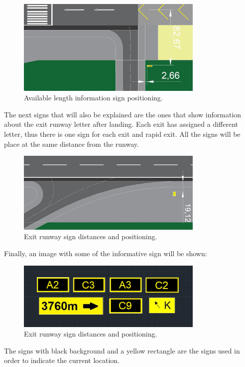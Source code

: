 	\begin{figure}[H]
		\centering
		\includegraphics[clip, trim=0cm 0cm 0cm 0cm, width=0.8\textwidth]{./images/signsexamples/TODAsign}
		\caption{Available length information sign positioning.} %
		\label{} %
	\end{figure}

	The next signs that will also be explained are the ones that show information about the exit runway letter after landing. Each exit has assigned a different letter, thus there is one sign for each exit and rapid exit. All the signs will be place at the same distance from the runway. 
	
	\begin{figure}[H]
		\centering
		\includegraphics[clip, trim=0cm 0cm 0cm 0cm, width=0.8\textwidth]{./images/signsexamples/exitexample}
		\caption{Exit runway sign distances and positioning.} %
		\label{} %
	\end{figure}

	Finally, an image with some of the informative sign will be shown:
	
	\begin{figure}[H]
		\centering
		\includegraphics[clip, trim=0cm 0cm 0cm 0cm, width=0.8\textwidth]{./images/signsexamples/exempleinf}
		\caption{Exit runway sign distances and positioning.} %
		\label{} %
	\end{figure}
	
	The signs with black background and a yellow rectangle are the signs used in order to indicate the current location. 
	

	